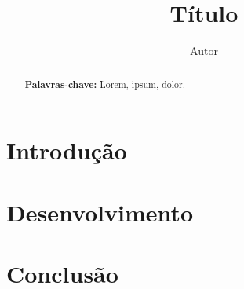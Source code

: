 

\title{Título \vspace{0.5cm}}

\author{Autor}

\date{\vspace{-2cm}} %


    \maketitle
    \setlength{\parindent}{1.25cm} %
    \onehalfspacing   %
    
    \begin{abstract}
        \normalsize
        \singlespacing
        \noindent \lipsum[1]  
        \vspace{0.5cm}
        
        \noindent \textbf{Palavras-chave:} Lorem, ipsum, dolor.
    \end{abstract}
    
    \section*{Introdução}    
    
    \section*{Desenvolvimento}
    
    \section*{Conclusão}
    

    \small
    
    

